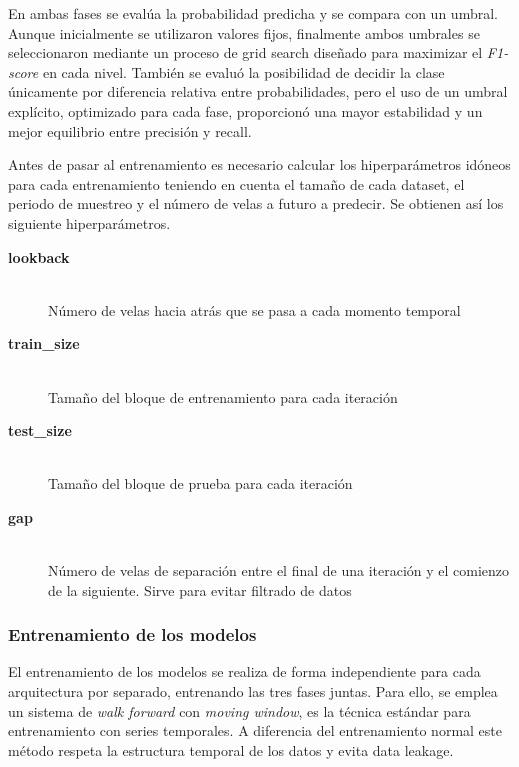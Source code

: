 En ambas fases se evalúa la probabilidad predicha y se compara con un umbral. Aunque inicialmente se utilizaron valores fijos, finalmente ambos
umbrales se seleccionaron mediante un proceso de grid search diseñado para maximizar el \textit{F1-score} en cada nivel. También se evaluó la
posibilidad de decidir la clase únicamente por diferencia relativa entre probabilidades, pero el uso de un umbral explícito, optimizado para cada
fase, proporcionó una mayor estabilidad y un mejor equilibrio entre precisión y recall.

Antes de pasar al entrenamiento es necesario calcular los hiperparámetros idóneos para cada entrenamiento teniendo en cuenta el tamaño de cada
dataset, el periodo de muestreo y el número de velas a futuro a predecir. Se obtienen así los siguiente hiperparámetros.

\begin{description}
    \item[\textbf{lookback}] \hfill \\
    Número de velas hacia atrás que se pasa a cada momento temporal

    \item[\textbf{train\_size}] \hfill \\
    Tamaño del bloque de entrenamiento para cada iteración

    \item[\textbf{test\_size}] \hfill \\
    Tamaño del bloque de prueba para cada iteración

    \item[\textbf{gap}] \hfill \\
    Número de velas de separación entre el final de una iteración y el comienzo de la siguiente. Sirve para evitar filtrado de datos
\end{description}

\subsubsection{Entrenamiento de los modelos}

El entrenamiento de los modelos se realiza de forma independiente para cada arquitectura por separado, entrenando las tres fases juntas. Para ello, se
emplea un sistema de \textit{walk forward} con \textit{moving window}, es la técnica estándar para entrenamiento con series temporales. A diferencia
del entrenamiento normal este método respeta la estructura temporal de los datos y evita data leakage.

